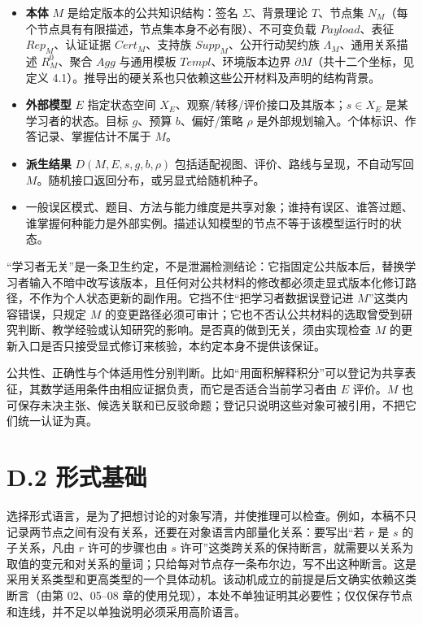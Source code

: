 \documentclass[UTF8,a4paper,zihao=-4,fontset=windows,openany]{ctexbook}
\def\mathrm#1{#1}%
\begin{document}
\begin{itemize}
\item \textbf{本体} \(M\) 是给定版本的公共知识结构：签名 \(\Sigma\)、背景理论 \(T\)、节点集 \(N_M\)（每个节点具有有限描述，节点集本身不必有限）、不可变负载 \(\mathrm{Payload}\)、表征 \(\mathrm{Rep}_M\)、认证证据 \(\mathrm{Cert}_M\)、支持族 \(\mathrm{Supp}_M\)、公开行动契约族 \(\Lambda_M\)、通用关系描述 \(R^{0}_M\)、聚合 \(\mathrm{Agg}\) 与通用模板 \(\mathrm{Templ}\)、环境版本边界 \(\partial M\)（共十二个坐标，见定义 4.1）。推导出的硬关系也只依赖这些公开材料及声明的结构背景。
\item \textbf{外部模型} \(E\) 指定状态空间 \(X_E\)、观察/转移/评价接口及其版本；\(s\in X_E\) 是某学习者的状态。目标 \(g\)、预算 \(b\)、偏好/策略 \(\rho\) 是外部规划输入。个体标识、作答记录、掌握估计不属于 \(M\)。
\item \textbf{派生结果} \(D(M,E,s,g,b,\rho)\) 包括适配视图、评价、路线与呈现，不自动写回 \(M\)。随机接口返回分布，或另显式给随机种子。
\item 一般误区模式、题目、方法与能力维度是共享对象；谁持有误区、谁答过题、谁掌握何种能力是外部实例。描述认知模型的节点不等于该模型运行时的状态。
\end{itemize}
“学习者无关”是一条卫生约定，不是泄漏检测结论：它指固定公共版本后，替换学习者输入不暗中改写该版本，且任何对公共材料的修改都必须走显式版本化修订路径，不作为个人状态更新的副作用。它挡不住“把学习者数据误登记进 \(M\)”这类内容错误，只规定 \(M\) 的变更路径必须可审计；它也不否认公共材料的选取曾受到研究判断、教学经验或认知研究的影响。是否真的做到无关，须由实现检查 \(M\) 的更新入口是否只接受显式修订来核验，本约定本身不提供该保证。

公共性、正确性与个体适用性分别判断。比如“用面积解释积分”可以登记为共享表征，其数学适用条件由相应证据负责，而它是否适合当前学习者由 \(E\) 评价。\(M\) 也可保存未决主张、候选关联和已反驳命题；登记只说明这些对象可被引用，不把它们统一认证为真。

\section{D.2 形式基础}
选择形式语言，是为了把想讨论的对象写清，并使推理可以检查。例如，本稿不只记录两节点之间有没有关系，还要在对象语言内部量化关系：要写出“若 \(r\) 是 \(s\) 的子关系，凡由 \(r\) 许可的步骤也由 \(s\) 许可”这类跨关系的保持断言，就需要以关系为取值的变元和对关系的量词；只给每对节点存一条布尔边，写不出这种断言。这是采用关系类型和更高类型的一个具体动机。该动机成立的前提是后文确实依赖这类断言（由第 02、05–08 章的使用兑现），本处不单独证明其必要性；仅仅保存节点和连线，并不足以单独说明必须采用高阶语言。
\end{document}

